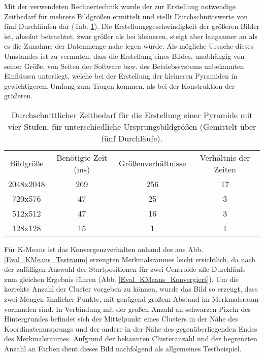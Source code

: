   Mit der verwendeten Rechnertechnik wurde der zur Erstellung notwendige Zeitbedarf für mehrere Bildgrößen ermittelt und stellt Durchschnittswerte von fünf Durchläufen dar (Tab. \ref{table:TabPyramidenzeit}). Die Erstellungsgeschwindigkeit der größeren Bilder ist, absolut betrachtet, zwar größer als bei kleineren, steigt aber langsamer an als es die Zunahme der Datenmenge nahe legen würde. Als mögliche Ursache dieses Umstandes ist zu vermuten, dass die Erstellung eines Bildes, unabhängig von seiner Größe, von Seiten der Software bzw. des Betriebssystems unbekannten Einflüssen unterliegt, welche bei der Erstellung der kleineren Pyramiden in gewichtigerem Umfang zum Tragen kommen, als bei der Konstruktion der größeren.
  \begin{table}[h]
    \begin{center}
      \begin{tabular}{cccc}
        Bildgröße & Benötigte Zeit (ms) & Größenverhältnisse & Verhältnis der Zeiten\\
	2048x2048	& 269	&	256	&	17\\
        720x576		& 47 	&	25	&	3\\
	512x512		& 47	&	16	&	3\\
	128x128		& 15	&	1	&	1\\
      \end{tabular}
    \end{center}
    \caption{Durchschnittlicher Zeitbedarf für die Erstellung einer Pyramide mit vier Stufen, für unterschiedliche Ursprungsbildgrößen (Gemittelt über fünf Durchläufe).}
    \label{table:TabPyramidenzeit}
  \end{table}


  \noindent Für K-Means ist das Konvergenzverhalten anhand des aus Abb. \ref{Eval_KMeans_Testraum} erzeugten Merkmalsraumes leicht ersichtlich, da nach der zufälligen Auswahl der Startpositionen für zwei Centroide alle Durchläufe zum gleichen Ergebnis führen (Abb. \ref{Eval_KMeans_Konvergiert}). Um die korrekte Anzahl der Cluster vorgeben zu können, wurde das Bild so erzeugt, dass zwei Mengen ähnlicher Punkte, mit genügend großem Abstand im Merkmalsraum vorhanden sind. In Verbindung mit der großen Anzahl an schwarzen Pixeln des Hintergrundes befindet sich der Mittelpunkt eines Clusters in der Nähe des Koordinatenursprungs und der andere in der Nähe des gegenüberliegenden Endes des Merkmalsraumes. Aufgrund der bekannten Clusteranzahl und der begrenzten Anzahl an Farben dient dieses Bild nachfolgend als allgemeines Testbeispiel.

